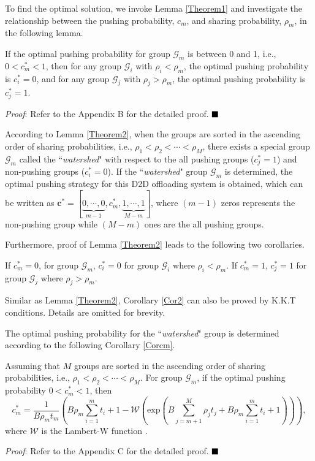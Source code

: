 \documentclass[12pt, draftclsnofoot, onecolumn]{IEEEtran}
\begin{document}
To find the optimal solution, we invoke Lemma \ref{Theorem1} and investigate the relationship between the pushing probability, $c_m$, and sharing probability, $\rho_m$, in the following lemma.​
\begin{lemma}\label{Theorem2}
If the optimal pushing probability for group $\mathcal{G}_m$ is between 0 and 1, i.e., $0<c_m^{\ast} <1$, then for any group $\mathcal{G}_{i}$ with $\rho_i < \rho_m$, the optimal pushing probability is $c_{i}^{\ast} =0$, and for any group $\mathcal{G}_{j}$ with $\rho_j > \rho_m$, the optimal pushing probability is $c_{j}^{\ast} =1$.
\end{lemma}
\textit{Proof}: Refer to the Appendix B for the detailed proof.
$\hfill\blacksquare$

According to Lemma \ref{Theorem2}, when the groups are sorted in the ascending order of sharing probabilities, i.e., $\rho_1 < \rho_2 <\cdots < \rho_M$, there exists a special group $\mathcal{G}_{m}$ called the ``\textit{watershed}" with respect to the all pushing groups ($c_j^{\ast}=1$) and non-pushing groups ($c_i^{\ast}=0$). If the ``\textit{watershed}"  group $\mathcal{G}_{m}$ is determined, the optimal pushing strategy for this D2D offloading system is obtained, which can be written as $\bm{c}^{\ast} =[\underbrace{0, \cdots, 0}_{m-1},c_m^{\ast},\underbrace{1, \cdots, 1}_{M-m}]$, where $(m-1)$ zeros represents the non-pushing group while $(M-m)$ ones are the all pushing groups. ​

Furthermore, proof of Lemma \ref{Theorem2} leads to the following two corollaries.
\begin{corollary}\label{Cor2}
If $c_m^{\ast} =0$, for group $\mathcal{G}_m$, $c_{i}^{\ast}= 0$ for group $\mathcal{G}_{i}$ where $\rho_i < \rho_m$. If $c_m^{\ast} =1$, $c_{j}^{\ast}= 1$ for group $\mathcal{G}_{j}$ where $\rho_j > \rho_m$.
\end{corollary}
Similar as Lemma \ref{Theorem2}, Corollary \ref{Cor2} can also be proved by K.K.T conditions. Details are omitted for brevity.

The optimal pushing probability for the ``\textit{watershed}"  group is determined according to the following Corollary \ref{Corcm}.
\begin{corollary}\label{Corcm}
Assuming that $M$ groups are sorted in the ascending order of sharing probabilities, i.e., $\rho_1 < \rho_2 <\cdots < \rho_M$. For group $\mathcal{G}_m$, if the optimal pushing probability $0<c_m^{\ast}<1$, then
\begin{equation}
c_m^{\ast}= \frac{1}{B\rho_m t_m}
\left( B\rho_m\sum\limits_{i=1}^{m} t_i +1 -\mathcal{W}(\textrm{exp}(B\sum\limits_{j=m+1}^{M} \rho_j t_j + B\rho_m\sum\limits_{i=1}^{m} t_i +1 )) \right),  \label{cm}
\end{equation}
where $\mathcal{W}$ is the Lambert-W function \cite{weisstein2002lambert}.

\end{corollary}
\textit{Proof}: Refer to the Appendix C for the detailed proof.
$\hfill\blacksquare$
\end{document}
